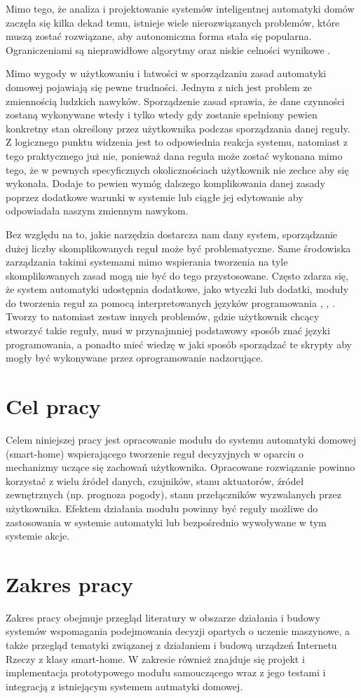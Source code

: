 Mimo tego, że analiza i projektowanie systemów inteligentnej automatyki domów zaczęła się kilka dekad temu, istnieje wiele nierozwiązanych problemów, które muszą zostać rozwiązane, aby autonomiczna forma stała się popularna. Ograniczeniami są nieprawidłowe algorytmy oraz niskie celności wynikowe \cite{episode_discovery_2}.

Mimo wygody w użytkowaniu i łatwości w sporządzaniu zasad automatyki domowej pojawiają się pewne trudności. Jednym z nich jest problem ze zmiennością ludzkich nawyków. Sporządzenie zasad sprawia, że dane czynności zostaną wykonywane wtedy i tylko wtedy gdy zostanie spełniony pewien konkretny stan określony przez użytkownika podczas sporządzania danej reguły. Z logicznego punktu widzenia jest to odpowiednia reakcja systemu, natomiast z tego praktycznego już nie, ponieważ dana reguła może zostać wykonana mimo tego, że w pewnych specyficznych okolicznościach użytkownik nie zechce aby się wykonała. Dodaje to pewien wymóg dalszego komplikowania danej zasady poprzez dodatkowe warunki w systemie lub ciągłe jej edytowanie aby odpowiadała naszym zmiennym nawykom.

Bez względu na to, jakie narzędzia dostarcza nam dany system, sporządzanie dużej liczby skomplikowanych reguł może być problematyczne. Same środowiska zarządzania takimi systemami mimo wspierania tworzenia na tyle skomplikowanych zasad mogą nie być do tego przystosowane. Często zdarza się, że system automatyki udostępnia dodatkowe, jako wtyczki lub dodatki, moduły do tworzenia reguł za pomocą interpretowanych języków programowania \cite{appdaemon:main}, \cite{domoticz:scripts}, \cite{openhab:scripts}. Tworzy to natomiast zestaw innych problemów, gdzie użytkownik chcący stworzyć takie reguły, musi w przynajmniej podstawowy sposób znać języki programowania, a ponadto mieć wiedzę w jaki sposób sporządzać te skrypty aby mogły być wykonywane przez oprogramowanie nadzorujące.


\section{Cel pracy}
Celem niniejszej pracy jest opracowanie modułu do systemu automatyki domowej (smart-home) wspierającego tworzenie reguł decyzyjnych w oparciu o mechanizmy uczące się zachowań użytkownika. Opracowane rozwiązanie powinno korzystać z wielu źródeł danych, czujników, stanu aktuatorów, źródeł zewnętrznych (np. prognoza pogody), stanu przełączników wyzwalanych przez użytkownika. Efektem działania modułu powinny być reguły możliwe do zastosowania w systemie automatyki lub bezpośrednio wywoływane w tym systemie akcje.

\section{Zakres pracy}
Zakres pracy obejmuje przegląd literatury w obszarze działania i budowy systemów wspomagania podejmowania decyzji opartych o uczenie maszynowe, a także przegląd tematyki związanej z działaniem i budową urządzeń Internetu Rzeczy z klasy smart-home. W zakresie również znajduje się projekt i implementacja prototypowego modułu samouczącego wraz z jego testami i integracją z istniejącym systemem autmatyki domowej.
